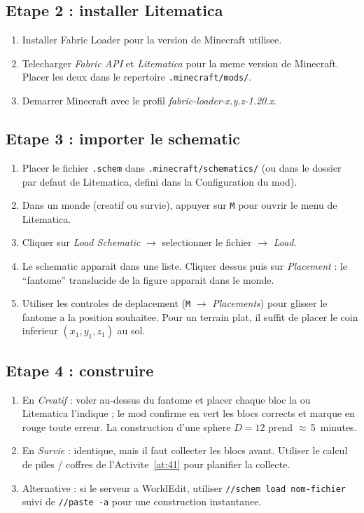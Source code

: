 \documentclass[12pt,a4paper]{scrartcl}
\newcommand{\cmd}[1]{\textcolor{earth}{\texttt{\small #1}}}
\begin{document}
\subsection{Etape 2 : installer Litematica}
\begin{enumerate}[leftmargin=1.5em,itemsep=0.15em,topsep=0.3em]
  \item Installer Fabric Loader pour la version de Minecraft utilisee.
  \item Telecharger \emph{Fabric API} et \emph{Litematica} pour la meme version de Minecraft. Placer les deux dans le repertoire \texttt{.minecraft/mods/}.
  \item Demarrer Minecraft avec le profil \emph{fabric-loader-x.y.z-1.20.x}.
\end{enumerate}

\subsection{Etape 3 : importer le schematic}
\begin{enumerate}[leftmargin=1.5em,itemsep=0.15em,topsep=0.3em]
  \item Placer le fichier \texttt{.schem} dans \texttt{.minecraft/schematics/} (ou dans le dossier par defaut de Litematica, defini dans la Configuration du mod).
  \item Dans un monde (creatif ou survie), appuyer sur \texttt{M} pour ouvrir le menu de Litematica.
  \item Cliquer sur \emph{Load Schematic} $\rightarrow$ selectionner le fichier $\rightarrow$ \emph{Load}.
  \item Le schematic apparait dans une liste. Cliquer dessus puis sur \emph{Placement} : le \enquote{fantome} translucide de la figure apparait dans le monde.
  \item Utiliser les controles de deplacement (\texttt{M} $\rightarrow$ \emph{Placements}) pour glisser le fantome a la position souhaitee. Pour un terrain plat, il suffit de placer le coin inferieur $(x_1, y_1, z_1)$ au sol.
\end{enumerate}

\subsection{Etape 4 : construire}
\begin{enumerate}[leftmargin=1.5em,itemsep=0.15em,topsep=0.3em]
  \item En \emph{Creatif} : voler au-dessus du fantome et placer chaque bloc la ou Litematica l'indique ; le mod confirme en vert les blocs corrects et marque en rouge toute erreur. La construction d'une sphere $D = 12$ prend $\approx$\,5~minutes.
  \item En \emph{Survie} : identique, mais il faut collecter les blocs avant. Utiliser le calcul de piles / coffres de l'Activite~\ref{at:41} pour planifier la collecte.
  \item Alternative : si le serveur a WorldEdit, utiliser \cmd{//schem load nom-fichier} suivi de \cmd{//paste -a} pour une construction instantanee.
\end{enumerate}
\end{document}
